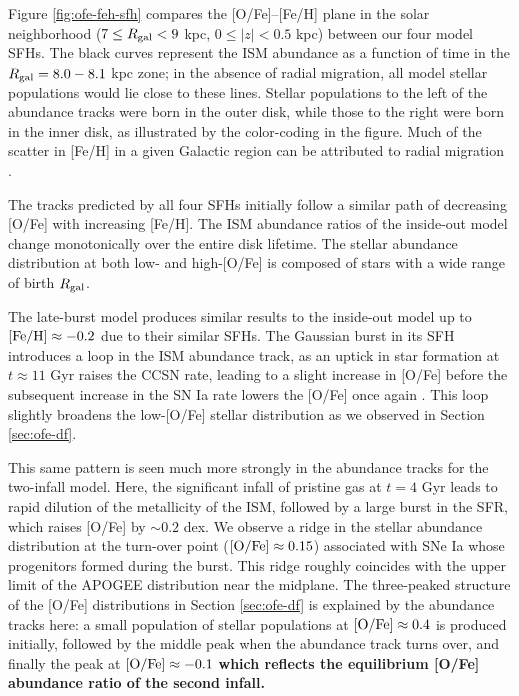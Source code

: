 \documentclass[twocolumn,twocolappendix,linenumbers]{aastex631}
\begin{document}
Figure \ref{fig:ofe-feh-sfh} compares the [O/Fe]--[Fe/H] plane in the solar neighborhood ($7\leq R_{\rm gal}<9$ kpc, $0\leq|z|<0.5$ kpc) between our four model SFHs. The black curves represent the ISM abundance as a function of time in the $R_{\rm gal}=8.0-8.1$ kpc zone; in the absence of radial migration, all model stellar populations would lie close to these lines. Stellar populations to the left of the abundance tracks were born in the outer disk, while those to the right were born in the inner disk, as illustrated by the color-coding in the figure. Much of the scatter in [Fe/H] in a given Galactic region can be attributed to radial migration \citep{Edvardsson1993-ChemicalEvolution}.

The tracks predicted by all four SFHs initially follow a similar path of decreasing [O/Fe] with increasing [Fe/H]. The ISM abundance ratios of the inside-out model change monotonically over the entire disk lifetime. The stellar abundance distribution at both low- and high-[O/Fe] is composed of stars with a wide range of birth $R_{\rm gal}$. 

The late-burst model produces similar results to the inside-out model up to ${\rm [Fe/H]}\approx-0.2$ due to their similar SFHs. The Gaussian burst in its SFH introduces a loop in the ISM abundance track, as an uptick in star formation at $t\approx11$ Gyr raises the CCSN rate, leading to a slight increase in [O/Fe] before the subsequent increase in the SN Ia rate lowers the [O/Fe] once again \citep[see e.g. Figure 1 of][]{JohnsonWeinberg2020-Starbursts}. This loop slightly broadens the low-[O/Fe] stellar distribution as we observed in Section \ref{sec:ofe-df}.

This same pattern is seen much more strongly in the abundance tracks for the two-infall model. Here, the significant infall of pristine gas at $t=4$ Gyr leads to rapid dilution of the metallicity of the ISM, followed by a large burst in the SFR, which raises [O/Fe] by $\sim 0.2$ dex. We observe a ridge in the stellar abundance distribution at the turn-over point (${\rm [O/Fe]}\approx0.15$) associated with SNe Ia whose progenitors formed during the burst. This ridge roughly coincides with the upper limit of the APOGEE distribution near the midplane. The three-peaked structure of the [O/Fe] distributions in Section \ref{sec:ofe-df} is explained by the abundance tracks here: a small population of stellar populations at ${\rm [O/Fe]}\approx0.4$ is produced initially, followed by the middle peak when the abundance track turns over, and finally the peak at ${\rm [O/Fe]}\approx-0.1$ %
{\bf which reflects the equilibrium [O/Fe] abundance ratio of the second infall.}
\end{document}
